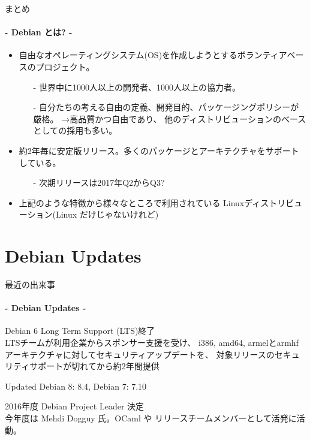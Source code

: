 \documentclass[cjk,dvipdfmx,14pt,compress,fragile]{beamer}
\newcommand{\textsmall}[1]{{\small{#1}}}
\begin{document}
\begin{frame}[c,fragile]{まとめ}
  \framesubtitle{- Debian とは? -}
  \pause
  \begin{itemize}[<+->]
  \item %
    自由なオペレーティングシステム(OS)を作成しようとするボランティアベースのプロジェクト。
    \begin{itemize}[<+->]
    \item[-] %
      世界中に1000人以上の開発者、1000人以上の協力者。
    \item[-] %
      自分たちの考える自由の定義、開発目的、パッケージングポリシーが厳格。
      →\alert{高品質}かつ\alert{自由}であり、
      他のディストリビューションのベースとしての採用も多い。
    \end{itemize}
  \item %
    約2年毎に安定版リリース。多くのパッケージとアーキテクチャをサポートしている。
    \begin{itemize}[<+->]
    \item[-] 次期リリースは2017年Q2からQ3?
    \end{itemize}
  \item %
    上記のような特徴から様々なところで利用されている
    Linuxディストリビューション{\tiny{(Linux だけじゃないけれど)}}
  \end{itemize}
\end{frame}


\section{Debian Updates}


\begin{frame}[c,fragile]{最近の出来事}
  \framesubtitle{- Debian Updates -}
  \pause
  \begin{description}[<+->]
  \item[2016/02/29]
    Debian 6 Long Term Support (LTS)終了 \\
    \textsmall{%
      LTSチームが利用企業からスポンサー支援を受け、
      i386, amd64, armelとarmhf アーキテクチャに対してセキュリティアップデートを、
      対象リリースのセキュリティサポートが\alert{切れてから}約2年間提供
    }
  \item[2016/04/02]
    Updated Debian 8: 8.4, Debian 7: 7.10
  \item[2016/04/02]
    2016年度 Debian Project Leader 決定\\
    \textsmall{%
      今年度は Mehdi Dogguy 氏。OCaml や リリースチームメンバーとして活発に活動。
    }
  \end{description}
\end{frame}
\end{document}
